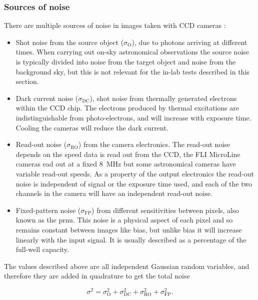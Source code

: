 \begin{colsection}
\begin{colsection}
\newpage
\subsubsection{Sources of noise}

There are multiple sources of noise in images taken with CCD cameras \citep{CCDs}:

\begin{itemize}
    \item Shot noise from the source object ($\sigma_\text{O}$), due to photons arriving at different times. When carrying out on-sky astronomical observations the source noise is typically divided into noise from the target object and noise from the background sky, but this is not relevant for the in-lab tests described in this section.

    \item Dark current noise ($\sigma_\text{DC}$), shot noise from thermally generated electrons within the CCD chip. The electrons produced by thermal excitations are indistinguishable from photo-electrons, and will increase with exposure time. Cooling the cameras will reduce the dark current.

    \item Read-out noise ($\sigma_\text{RO}$) from the camera electronics. The read-out noise depends on the speed data is read out from the CCD, the FLI MicroLine cameras ead out at a fixed \SI{8}{\mega\hertz} but some astronomical cameras have variable read-out speeds. As a property of the output electronics the read-out noise is independent of signal or the exposure time used, and each of the two channels in the camera will have an independent read-out noise.

    \item Fixed-pattern noise ($\sigma_\text{FP}$) from different sensitivities between pixels, also known as the \gls{prnu}. This noise is a physical aspect of each pixel and so remains constant between images like bias, but unlike bias it will increase linearly with the input signal. It is usually described as a percentage of the full-well capacity.

\end{itemize}

The values described above are all independent Gaussian random variables, and therefore they are added in quadrature to get the total noise

\begin{equation}
    \sigma^2 = \sigma_\text{O}^2 + \sigma_\text{DC}^2 + \sigma_\text{RO}^2 + \sigma_\text{FP}^2.
    \label{eq:noise}
\end{equation}


\end{colsection}
\end{colsection}

